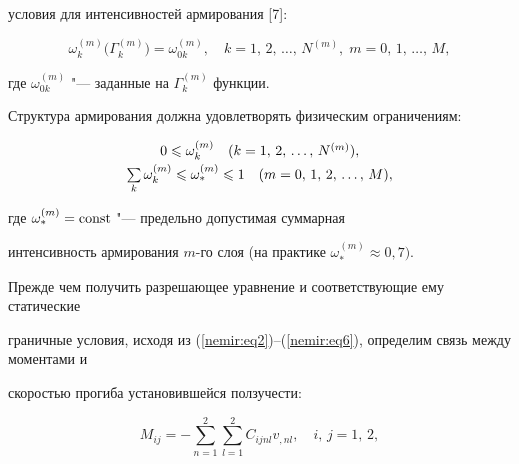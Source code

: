 условия для интенсивностей армирования [7]:

\begin{equation}

\label{nemir:eq12}

\omega _k^{(m)} \bigl(\Gamma _k^{(m)}  \bigr) = \omega _{0k}^{(m)} ,\quad 

k = 1,\,2,\,\dots,\,N^{(m)},\; 

m = 0,\,1,\,\dots,\,M,

\end{equation}

где $\omega _{0k}^{(m)} $ "--- заданные на $\Gamma _k^{(m)} $ функции.



Структура армирования должна удовлетворять физическим ограничениям:

\begin{equation}

\label{nemir:eq13}

\begin{array}{c}

0 \leqslant \omega _k^{(m)} \quad (k = 1,\,2,\,\dots,\,N^{(m)}),\vspace{1mm}\\

\sum\limits_k {\omega _k^{(m)} } \leqslant \omega_* ^{(m)} \leqslant 1\quad

(m = 0,\,1,\,2,\,\dots,\,M),

\end{array}

\end{equation}

где $\omega_*^{(m)} = {\rm const}$ "--- предельно допустимая суммарная 

интенсивность армирования $m$-го слоя (на практике $\omega _ * ^{(m)} \approx 

0,7)$.



Прежде чем получить разрешающее уравнение и соответствующие ему статические 

граничные условия, исходя из (\ref{nemir:eq2})--(\ref{nemir:eq6}), определим связь между моментами и 

скоростью прогиба установившейся ползучести:

\begin{equation}

\label{nemir:eq14}

M_{ij} = - \sum\limits_{n = 1}^2 {\sum\limits_{l = 1}^2 {C_{ijnl} } } 

v_{,nl} ,\quad i,\,j = 1,\,2,

\end{equation}

